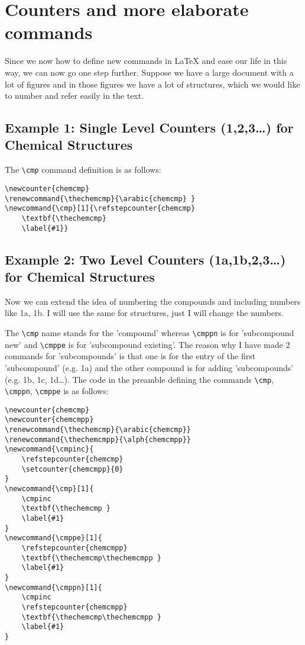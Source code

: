 \documentclass[
    draft
]{scrartcl}
\newcounter{chemcmp}
\newcounter{chemcmpp}
\renewcommand{\thechemcmp}{\arabic{chemcmp}}
\renewcommand{\thechemcmpp}{\alph{chemcmpp}}
\newcommand{\cmpinc}{
    \refstepcounter{chemcmp}
    \setcounter{chemcmpp}{0}
}
\newcommand{\cmp}[1]{
    \cmpinc
    \textbf{\thechemcmp }
    \label{#1}
}
\newcommand{\cmppe}[1]{
    \refstepcounter{chemcmpp}
    \textbf{\thechemcmp\thechemcmpp }
    \label{#1}
}
\newcommand{\cmppn}[1]{
    \cmpinc
    \refstepcounter{chemcmpp}
    \textbf{\thechemcmp\thechemcmpp }
    \label{#1}
}
\begin{document}
\section{Counters and more elaborate commands}


Since we now how to define new commands in \LaTeX{} and ease our life in this
way, we can now go one step further. Suppose we have a large document with a lot
of figures and in those figures we have a lot of structures, which we would like
to number and refer easily in the text. 

\subsection{Example 1: Single Level Counters (1,2,3\ldots) for Chemical
    Structures}

%



The \verb|\cmp| command definition is as follows:
\begin{lstlisting}
\newcounter{chemcmp}
\renewcommand{\thechemcmp}{\arabic{chemcmp} }
\newcommand{\cmp}[1]{\refstepcounter{chemcmp}
    \textbf{\thechemcmp}
    \label{#1}}
\end{lstlisting}

\subsection{Example 2: Two Level Counters (1a,1b,2,3\ldots) for Chemical
    Structures}

%
Now we can extend the idea of numbering the compounds and including numbers like
1a, 1b. I will use the same for structures, just I will change the numbers.




The \verb|\cmp| name stands for the 'compound'
whereas \verb|\cmppn| is for 'subcompound new' and \verb|\cmppe| is for
'subcompound existing'. The reason why I have made 2 commands for 'subcompounds'
is that one is for the entry of the first 'subcompound' (e.g. 1a) and the other
compound is for adding 'subcompounds' (e.g. 1b, 1c, 1d\ldots).
The code in the preamble defining the commands \verb|\cmp|, \verb|\cmppn|,
\verb|\cmppe| is as follows:
\begin{lstlisting}
\newcounter{chemcmp}
\newcounter{chemcmpp}
\renewcommand{\thechemcmp}{\arabic{chemcmp}}
\renewcommand{\thechemcmpp}{\alph{chemcmpp}}
\newcommand{\cmpinc}{
    \refstepcounter{chemcmp}
    \setcounter{chemcmpp}{0}
}
\newcommand{\cmp}[1]{
    \cmpinc
    \textbf{\thechemcmp }
    \label{#1}
}
\newcommand{\cmppe}[1]{
    \refstepcounter{chemcmpp}
    \textbf{\thechemcmp\thechemcmpp }
    \label{#1}
}
\newcommand{\cmppn}[1]{
    \cmpinc
    \refstepcounter{chemcmpp}
    \textbf{\thechemcmp\thechemcmpp }
    \label{#1}
}
\end{lstlisting}
\end{document}
